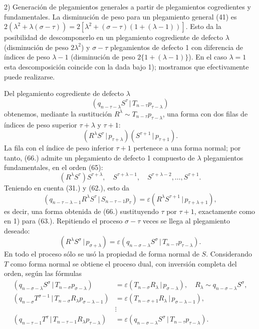 \documentclass[11pt]{article}
\newcommand{\pair}[2]{(#1\,|\,#2)}
\newcommand{\eps}{\varepsilon}
\begin{document}
2) Generación de plegamientos generales a partir de plegamientos cogredientes y fundamentales. La disminución de peso para un plegamiento general (41) es $2(\lambda^2+\lambda(\sigma-\tau))=2[\lambda^2+(\sigma-\tau)(1+(\lambda-1))]$. Esto da la posibilidad de descomponerlo en un plegamiento cogrediente de defecto $\lambda$ (disminución de peso $2\lambda^2$) y $\sigma-\tau$ plegamientos de defecto 1 con diferencia de índices de peso $\lambda-1$ (disminución de peso $2\{1+(\lambda-1)\}$). En el caso $\lambda=1$ esta descomposición coincide con la dada bajo 1); mostramos que efectivamente puede realizarse.

Del plegamiento cogrediente de defecto $\lambda$
\[
 \pair{q_{n-\tau-\lambda}S^\tau}{T_{n-\tau}p_{\tau-\lambda}}
\]
obtenemos, mediante la sustitución $R^\lambda\sim T_{n-\tau}p_{\tau-\lambda}$, una forma con dos filas de índices de peso superior $\tau+\lambda$ y $\tau+1$:
\begin{equation}
 \pair{R^\lambda S^\tau}{p_{\tau+\lambda}}\pair{S^{\tau+1}}{p_{\tau+1}}.
\tag{66}
\end{equation}
La fila con el índice de peso inferior $\tau+1$ pertenece a una forma normal; por tanto, (66.) admite un plegamiento de defecto 1 compuesto de $\lambda$ plegamientos fundamentales, en el orden (65):
\[
 (R^\lambda S^\tau)S^{\tau+\lambda},\quad S^{\tau+\lambda-1},\quad S^{\tau+\lambda-2},\ldots,S^{\tau+1}.
\]
Teniendo en cuenta (31.) y (62.), esto da
\[
 \pair{q_{n-\tau-\lambda-1}R^\lambda S^\tau}{S_{n-\tau-1}p_\tau}=\eps\pair{R^\lambda S^{\tau+1}}{p_{\tau+\lambda+1}},
\]
es decir, una forma obtenida de (66.) sustituyendo $\tau$ por $\tau+1$, exactamente como en 1) para (63.). Repitiendo el proceso $\sigma-\tau$ veces se llega al plegamiento deseado:
\[
 \pair{R^\lambda S^\sigma}{p_{\sigma+\lambda}}=\eps\pair{q_{n-\sigma-\lambda}S^\sigma}{T_{n-\tau}p_{\tau-\lambda}}.
\]
En todo el proceso sólo se usó la propiedad de forma normal de $S$. Considerando $T$ como forma normal se obtiene el proceso dual, con inversión completa del orden, según las fórmulas
\begin{align*}
\pair{q_{n-\sigma-\lambda}S^\sigma}{T_{n-\sigma}p_{\sigma-\lambda}}&=\eps\pair{T_{n-\sigma}R_\lambda}{p_{\sigma-\lambda}},\quad R_\lambda\sim q_{n-\sigma-\lambda}S^\sigma,\\
\pair{q_{n-\sigma}T^{\sigma-1}}{T_{n-\sigma}R_\lambda p_{\sigma-\lambda-1}}&=\eps\pair{T_{n-\sigma+1}R_\lambda}{p_{\sigma-\lambda-1}},\\
&\vdots\\
\pair{q_{n-\tau-1}T^\tau}{T_{n-\tau-1}R_\lambda p_{\tau-\lambda}}&=\eps\pair{q_{n-\sigma-\lambda}S^\sigma}{T_{n-\tau}p_{\tau-\lambda}}.
\end{align*}
\end{document}
